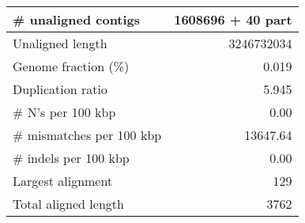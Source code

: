 \documentclass[12pt,a4paper]{article}
\begin{document}
\begin{table}[ht]
\begin{center}
\begin{tabular}{|l*{1}{|r}|}
\# unaligned contigs & 1608696 + 40 part \\ \hline
Unaligned length & 3246732034 \\ \hline
Genome fraction (\%) & 0.019 \\ \hline
Duplication ratio & 5.945 \\ \hline
\# N's per 100 kbp & 0.00 \\ \hline
\# mismatches per 100 kbp & 13647.64 \\ \hline
\# indels per 100 kbp & 0.00 \\ \hline
Largest alignment & 129 \\ \hline
Total aligned length & 3762 \\ \hline
\end{tabular}
\end{center}
\end{table}
\end{document}
